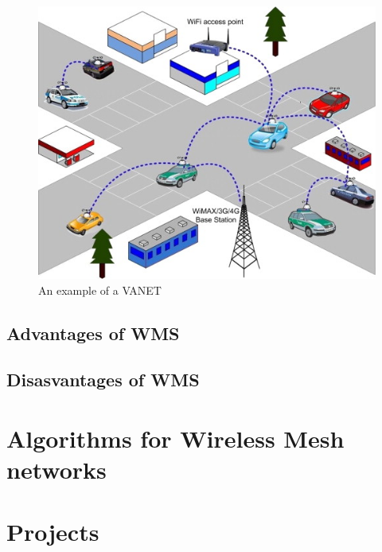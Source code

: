 		\begin{minipage}{0.48\textwidth}\raggedright
			\begin{figure}[H]
				\centering
				\includegraphics[width=\textwidth]{resources/img/chap4/vanet}
				\caption[An example of a VANET]{An example of a VANET\cite{BADIS2015653}}
				\label{img:vanet}
			\end{figure}
		\end{minipage}
		
	
	
	
	
		\subsection{Advantages of WMS}
		
		\subsection{Disasvantages of WMS}
	
	\section{Algorithms for Wireless Mesh networks}
	
						
	
	\section{Projects}
		
